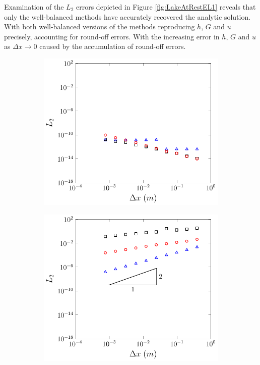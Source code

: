 Examination of the $L_2$ errors depicted in Figure \ref{fig:LakeAtRestEL1} reveals that only the well-balanced methods have accurately recovered the analytic solution. With both well-balanced versions of the methods reproducing $h$, $G$ and $u$ precisely, accounting for round-off errors. With the increasing error in $h$, $G$ and $u$ as $\Delta x \rightarrow 0$ caused by the accumulation of round-off errors.

\begin{figure}
	\centering
	\begin{subfigure}{0.5\textwidth}
		\includegraphics[width=\textwidth]{./chp5/figures/Analytic/LakeAtRest/L2/FEVMWB.pdf}
		\vspace{0.3cm}
	\end{subfigure}%
	\begin{subfigure}{0.5\textwidth}
		\includegraphics[width=\textwidth]{./chp5/figures/Analytic/LakeAtRest/L2/FEVMnWB.pdf}

\end{subfigure}
\end{figure}

